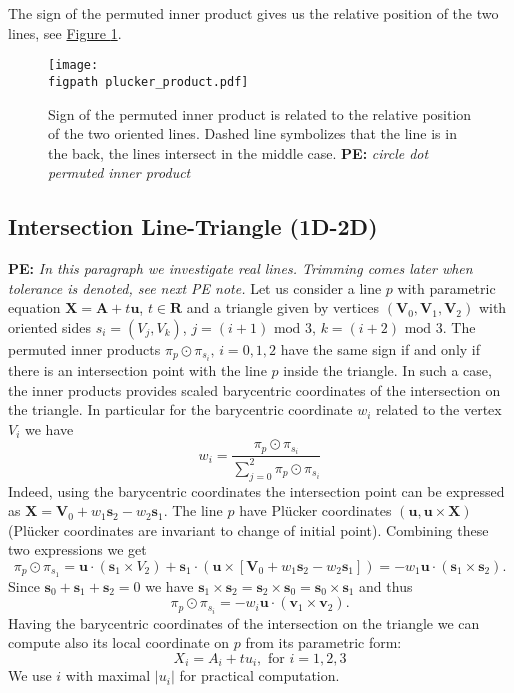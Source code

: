 \documentclass{elsarticle}
\newcommand{\fig}[1]{\hyperref[#1]{Figure \ref{#1}}}
\newcommand{\figpath}{figures/}
\def\vc#1{\mathbf{\boldsymbol{#1}}}     %
\newcommand{\R}{\mathbf{R}}
\newcommand{\notePE}[1]{{\color{Orange} \textbf{PE: } \textit{#1}}}
\newcommand{\plucker}{Pl\"{u}cker }
\begin{document}
The sign of the permuted inner product gives us the relative position of the two lines, 
see \fig{fig:plucker_products}.



\begin{figure}[!htb]
  \begin{center}        
    \texttt{[image: \\figpath plucker\_product.pdf]}
  \end{center}
  \caption{Sign of the permuted inner product is related to the relative position of the two oriented lines. Dashed line symbolizes that the line is in the back, the lines intersect in the middle case.
           \notePE{circle dot permuted inner product}}
  \label{fig:plucker_products}
\end{figure}



\subsection{Intersection Line-Triangle (1D-2D)}
\notePE{In this paragraph we investigate real lines. Trimming comes later when tolerance is denoted, see next PE note.}
Let us consider a line $p$ with parametric equation $\vc X = \vc A + t\vc u$, $t\in\R$ and a triangle given by vertices $(\vc V_0, \vc V_1, \vc V_2)$ 
with oriented sides $s_i=(V_j, V_k)$, $j=(i+1)\text{ mod }3$, $k=(i+2)\text{ mod }3$. The permuted inner products $\pi_p \odot \pi_{s_i},\, i=0,1,2$ have the same sign if and only if there
is an intersection point with the       line $p$ inside the triangle. In such a case, the inner products provides scaled barycentric coordinates of the intersection on the triangle.
In particular for the barycentric coordinate $w_i$ related to the vertex $V_i$ we have
\[
   w_i = \frac{\pi_p \odot \pi_{s_i}}{ \sum_{j=0}^{2} \pi_p \odot \pi_{s_i} }
\]
Indeed, using the barycentric coordinates the intersection point can be expressed as $\vc X = \vc V_0 + w_1 \vc s_2 - w_2 \vc s_1$.
The line $p$ have \plucker coordinates $(\vc u, \vc u \times \vc X)$ (\plucker coordinates are invariant to change of initial point). Combining these two expressions we get
\[
   \pi_p \odot \pi_{s_1} = \vc u \cdot (\vc s_1 \times V_2) + \vc s_1 \cdot ( \vc u \times [\vc V_0 + w_1\vc s_2 - w_2 \vc s_1])
   =-w_1 \vc u \cdot (\vc s_1 \times \vc s_2).
\]
Since $\vc s_0 + \vc s_1 + \vc s_2=0$ we have $ \vc s_1 \times \vc s_2 = \vc s_2 \times \vc s_0 = \vc s_0 \times \vc s_1$ and thus
\[
   \pi_p \odot \pi_{s_i} = -w_i \vc u \cdot (\vc v_1 \times \vc v_2).
\]
Having the barycentric coordinates of the intersection on the triangle we can compute also its local coordinate on $p$ from its parametric form:
\[
   X_i  = A_i + t u_i, \text{ for } i=1,2,3
\]
We use $i$ with maximal $|u_i|$ for practical computation.
\end{document}
